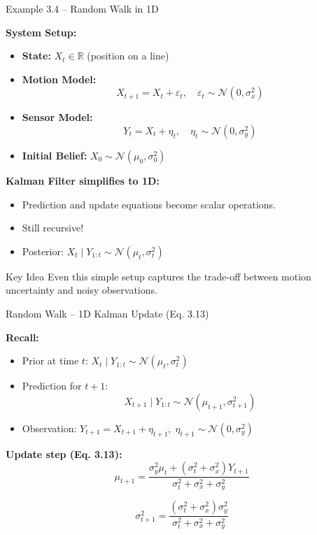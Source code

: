 \documentclass[handout,aspectratio=169]{beamer}
\begin{document}
\begin{frame}{Example 3.4 – Random Walk in 1D}

\textbf{System Setup:}

\begin{itemize}
  \item \textbf{State:} \( X_t \in \mathbb{R} \) (position on a line)
  \item \textbf{Motion Model:}
  \[
    X_{t+1} = X_t + \varepsilon_t, \quad \varepsilon_t \sim \mathcal{N}(0, \sigma_x^2)
  \]
  \item \textbf{Sensor Model:}
  \[
    Y_t = X_t + \eta_t, \quad \eta_t \sim \mathcal{N}(0, \sigma_y^2)
  \]
  \item \textbf{Initial Belief:} \( X_0 \sim \mathcal{N}(\mu_0, \sigma_0^2) \)
\end{itemize}

\textbf{Kalman Filter simplifies to 1D:}

\begin{itemize}
  \item Prediction and update equations become scalar operations.
  \item Still recursive!
  \item Posterior: \( X_t \mid Y_{1:t} \sim \mathcal{N}(\mu_t, \sigma_t^2) \)
\end{itemize}

\begin{block}{Key Idea}
Even this simple setup captures the trade-off between motion uncertainty and noisy observations.
\end{block}

\end{frame}

\begin{frame}{Random Walk – 1D Kalman Update (Eq. 3.13)}

\textbf{Recall:}
\begin{itemize}
  \item Prior at time \( t \): \( X_t \mid Y_{1:t} \sim \mathcal{N}(\mu_t, \sigma_t^2) \)
  \item Prediction for \( t+1 \): 
  \[
    X_{t+1} \mid Y_{1:t} \sim \mathcal{N}(\mu_{t+1}, \sigma_{t+1}^2 )
  \]
  \item Observation: \( Y_{t+1} = X_{t+1} + \eta_{t+1}, \; \eta_{t+1} \sim \mathcal{N}(0, \sigma_y^2) \)
\end{itemize}

\textbf{Update step (Eq. 3.13):}
\[
\mu_{t+1} = \frac{\sigma_y^2 \mu_t + (\sigma_t^2 + \sigma_x^2) Y_{t+1}}{\sigma_t^2 + \sigma_x^2 + \sigma_y^2}
\]

\[
\sigma_{t+1}^2 = \frac{(\sigma_t^2 + \sigma_x^2) \sigma_y^2}{\sigma_t^2 + \sigma_x^2 + \sigma_y^2}
\]

\end{frame}
\end{document}
